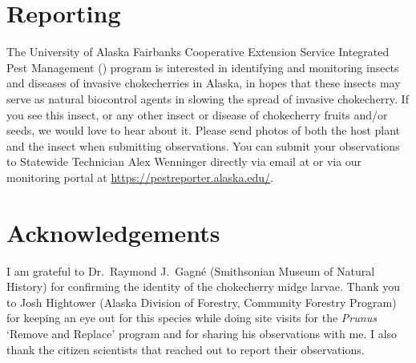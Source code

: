\section{Reporting}
 The University of Alaska Fairbanks Cooperative Extension Service Integrated Pest Management () program is interested in identifying and monitoring insects and diseases of invasive chokecherries in Alaska, in hopes that these insects may serve as natural biocontrol agents in slowing the spread of invasive chokecherry. If you see this insect, or any other insect or disease of chokecherry fruits and/or seeds, we would love to hear about it. Please send photos of both the host plant and the insect when submitting observations. You can submit your observations to Statewide  Technician Alex Wenninger directly via email at  or via our monitoring portal at \url{https://pestreporter.alaska.edu/}.  
 
\section{Acknowledgements}
I am grateful to Dr.\ Raymond J.\ Gagn\'{e} (Smithsonian Museum of Natural History) for confirming the identity of the chokecherry midge larvae. Thank you to Josh Hightower (Alaska  Division of Forestry, Community Forestry Program) for keeping an eye out for this species while doing site visits for the \textit{Prunus} `Remove and Replace' program and for sharing his observations with me. I also thank the citizen scientists that reached out to report their observations. 

